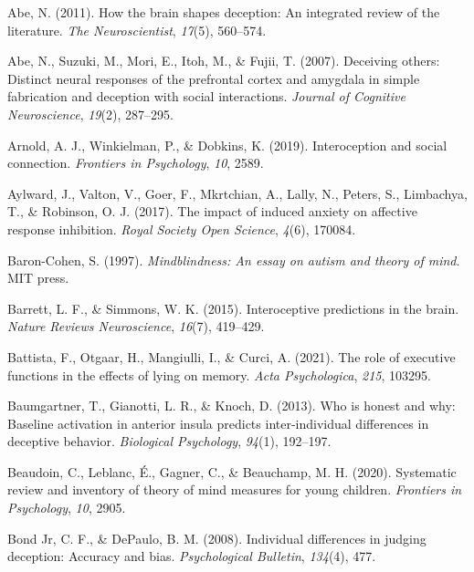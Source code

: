 \documentclass[
  man,mask,floatsintext]{apa6}
\newlength{\cslhangindent}
\newenvironment{CSLReferences}[2] %
 {\begin{list}{}{%
  \setlength{\itemindent}{0pt}
  \setlength{\leftmargin}{0pt}
  \setlength{\parsep}{0pt}
  \ifodd #1
   \setlength{\leftmargin}{\cslhangindent}
   \setlength{\itemindent}{-1\cslhangindent}
  \fi
  \setlength{\itemsep}{#2\baselineskip}}}
 {\end{list}}
\begin{document}
\label{refs}
\begin{CSLReferences}{1}{0}
Abe, N. (2011). How the brain shapes deception: An integrated review of the literature. \emph{The Neuroscientist}, \emph{17}(5), 560--574.

Abe, N., Suzuki, M., Mori, E., Itoh, M., \& Fujii, T. (2007). Deceiving others: Distinct neural responses of the prefrontal cortex and amygdala in simple fabrication and deception with social interactions. \emph{Journal of Cognitive Neuroscience}, \emph{19}(2), 287--295.

Arnold, A. J., Winkielman, P., \& Dobkins, K. (2019). Interoception and social connection. \emph{Frontiers in Psychology}, \emph{10}, 2589.

Aylward, J., Valton, V., Goer, F., Mkrtchian, A., Lally, N., Peters, S., Limbachya, T., \& Robinson, O. J. (2017). The impact of induced anxiety on affective response inhibition. \emph{Royal Society Open Science}, \emph{4}(6), 170084.

Baron-Cohen, S. (1997). \emph{Mindblindness: An essay on autism and theory of mind}. MIT press.

Barrett, L. F., \& Simmons, W. K. (2015). Interoceptive predictions in the brain. \emph{Nature Reviews Neuroscience}, \emph{16}(7), 419--429.

Battista, F., Otgaar, H., Mangiulli, I., \& Curci, A. (2021). The role of executive functions in the effects of lying on memory. \emph{Acta Psychologica}, \emph{215}, 103295.

Baumgartner, T., Gianotti, L. R., \& Knoch, D. (2013). Who is honest and why: Baseline activation in anterior insula predicts inter-individual differences in deceptive behavior. \emph{Biological Psychology}, \emph{94}(1), 192--197.

Beaudoin, C., Leblanc, É., Gagner, C., \& Beauchamp, M. H. (2020). Systematic review and inventory of theory of mind measures for young children. \emph{Frontiers in Psychology}, \emph{10}, 2905.

Bond Jr, C. F., \& DePaulo, B. M. (2008). Individual differences in judging deception: Accuracy and bias. \emph{Psychological Bulletin}, \emph{134}(4), 477.


\end{CSLReferences}
\end{document}
